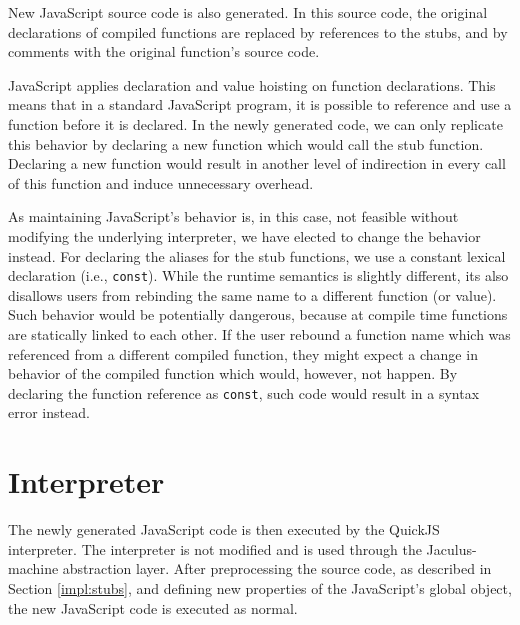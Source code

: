 
New JavaScript source code is also generated. In this source code, the original declarations of compiled functions are replaced by references to the stubs, and by comments with the original function's source code.

JavaScript applies declaration and value hoisting on function declarations. This means that in a standard JavaScript program, it is possible to reference and use a function before it is declared. In the newly generated code, we can only replicate this behavior by declaring a new function which would call the stub function. Declaring a new function would result in another level of indirection in every call of this function and induce unnecessary overhead.

As maintaining JavaScript's behavior is, in this case, not feasible without modifying the underlying interpreter, we have elected to change the behavior instead. For declaring the aliases for the stub functions, we use a constant lexical declaration (i.e., \texttt{const}). While the runtime semantics is slightly different, its also disallows users from rebinding the same name to a different function (or value). Such behavior would be potentially dangerous, because at compile time functions are statically linked to each other. If the user rebound a function name which was referenced from a different compiled function, they might expect a change in behavior of the compiled function which would, however, not happen. By declaring the function reference as \texttt{const}, such code would result in a syntax error instead.


\section{Interpreter}

The newly generated JavaScript code is then executed by the QuickJS interpreter. The interpreter is not modified and is used through the Jaculus-machine abstraction layer. After preprocessing the source code, as described in Section \ref{impl:stubs}, and defining new properties of the JavaScript's global object, the new JavaScript code is executed as normal.

